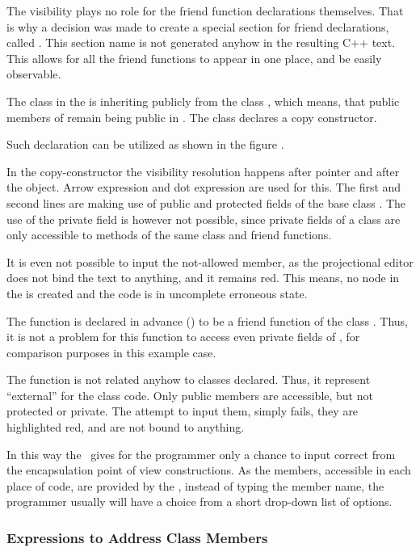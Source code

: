 The visibility plays no role for the friend function 
declarations themselves. That is why a decision was made to create a special 
section for friend declarations, called . This section name is not generated anyhow in the 
resulting C++ text. This allows for all the friend functions to appear in one place, 
and be easily observable.

The class  in the  is inheriting publicly from the class , which means,
that public members of  remain being public in . The class  declares
a copy constructor.

Such declaration can be utilized as shown in the figure .


In the copy-constructor the visibility resolution happens after  pointer
and after the  object. Arrow expression and dot expression are used for
this. The first and second lines are making use of public and protected fields of 
the base class . The use of the private field is however not possible, since
private fields of a class are only accessible to methods of the same class and
friend functions. 

It is even not possible to input the not-allowed member, as the projectional editor
does not bind the text to anything, and it remains red. This means, no node in the 
is created and the code is in uncomplete erroneous state.


The  function is declared in advance () to be a friend 
function of the class . Thus, it is not a problem for this function to access
even private fields of , for comparison purposes in this example case.

The function  is not related anyhow to classes declared. Thus,
it represent ``external'' for the class  code. Only public members
are accessible, but not protected or private. The attempt to input them, simply
fails, they are highlighted red, and are not bound to anything.

In this way the \pcpp\ gives for the programmer only a chance to input correct from the encapsulation
point of view constructions. As the members, accessible in each place of code, are provided by the 
\pcpp, instead of typing the member name, the programmer usually will have a choice from a short drop-down
list of options.

\subsubsection{Expressions to Address Class Members}

